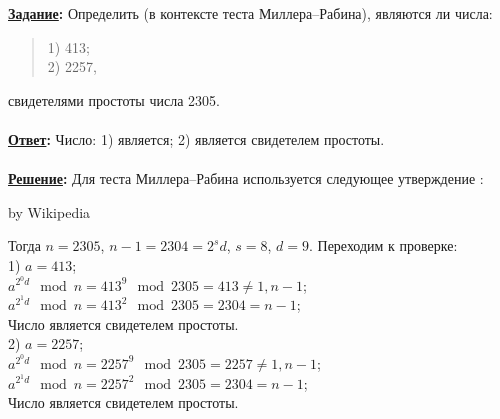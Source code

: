 \documentclass{article}
\begin{document}
\textbf{\uline{Задание}:} Определить (в контексте теста Миллера--Рабина), являются ли числа:
\begin{flushleft}
\begin{verse}
1) 413;\\
2) 2257,\end{verse}
\end{flushleft}
свидетелями простоты числа 2305.\\
\\
\textbf{\uline{Ответ}:} Число: 1) является; 2) является свидетелем простоты.\\
\\
\textbf{ \uline{Решение}: } Для теста Миллера--Рабина используется следующее утверждение : \\
\noindent{}
\begin{flushright}\footnotesize by Wikipedia \end{flushright}
Тогда $n=2305$, $n-1=2304=2^{s}d$, $s=8$, $d=9$. Переходим к проверке:\\
1) $a=413$;\\
$a^{2^{0}d}\mod n=413^{9}\mod 2305=413\not=1, n-1$;\\
$a^{2^{1}d}\mod n=413^{2}\mod 2305=2304=n-1$;\\
Число является свидетелем простоты.\\
2) $a=2257$;\\
$a^{2^{0}d}\mod n=2257^{9}\mod 2305=2257\not=1, n-1$;\\
$a^{2^{1}d}\mod n=2257^{2}\mod 2305=2304=n-1$;\\
Число является свидетелем простоты.\\
\end{document}
